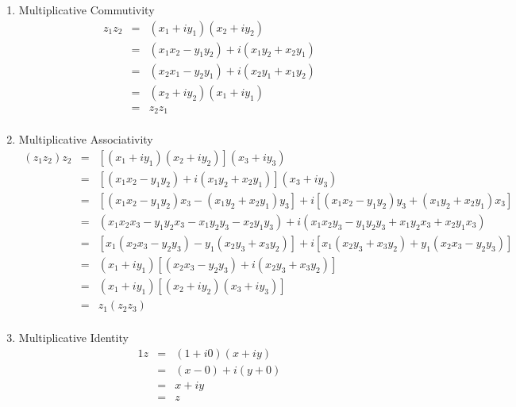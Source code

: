 \documentclass[letterpaper,12pt,fleqn]{article}
\begin{document}
\begin{theproof}
\begin{enumerate}
\item Multiplicative Commutivity
\begin{eqnarray*}
z_1z_2 &=& (x_1+iy_1)(x_2+iy_2) \\
    &=& (x_1x_2-y_1y_2)+i(x_1y_2+x_2y_1) \\
    &=& (x_2x_1-y_2y_1)+i(x_2y_1+x_1y_2) \\
    &=& (x_2+iy_2)(x_1+iy_1) \\
    &=& z_2z_1 \\
\end{eqnarray*}

\item Multiplicative Associativity
\begin{eqnarray*}
(z_1z_2)z_2 &=& [(x_1+iy_1)(x_2+iy_2)](x_3+iy_3) \\
    &=& [(x_1x_2-y_1y_2)+i(x_1y_2+x_2y_1)](x_3+iy_3) \\
    &=& [(x_1x_2-y_1y_2)x_3-(x_1y_2+x_2y_1)y_3]+
        i[(x_1x_2-y_1y_2)y_3+(x_1y_2+x_2y_1)x_3] \\
    &=& (x_1x_2x_3-y_1y_2x_3-x_1y_2y_3-x_2y_1y_3)+
        i(x_1x_2y_3-y_1y_2y_3+x_1y_2x_3+x_2y_1x_3) \\
    &=& [x_1(x_2x_3-y_2y_3)-y_1(x_2y_3+x_3y_2)]+
        i[x_1(x_2y_3+x_3y_2)+y_1(x_2x_3-y_2y_3)] \\
    &=& (x_1+iy_1)[(x_2x_3-y_2y_3)+i(x_2y_3+x_3y_2)] \\
    &=& (x_1+iy_1)[(x_2+iy_2)(x_3+iy_3)] \\
    &=& z_1(z_2z_3) \\
\end{eqnarray*}

\item Multiplicative Identity
\begin{eqnarray*}
1z &=& (1+i0)(x+iy) \\
    &=& (x-0)+i(y+0) \\
    &=& x+iy \\
    &=& z \\
\end{eqnarray*}


\end{enumerate}
\end{theproof}
\end{document}
